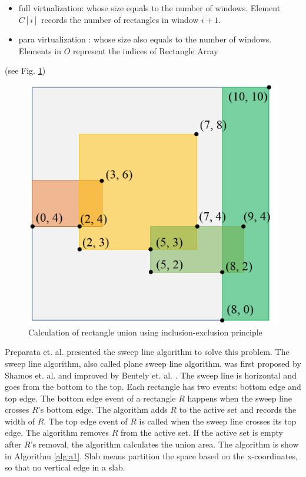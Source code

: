 \begin{itemize}
    \item full virtualization: whose size equals to the number of windows.  Element $C[i]$ records the number of rectangles in window $i+1$.
    \item para virtualization : whose size also equals to the number of windows.  Elements in $O$ represent the indices of Rectangle Array 
\end{itemize}

 (see Fig. \ref{fig:fig_2_2})
\begin{figure}[!h]
    \centering
    \includegraphics[scale=0.4]{image/fig_2_2}
    \caption{Calculation of rectangle union using inclusion-exclusion principle}
    \label{fig:fig_2_2}
\end{figure}

Preparata et. al. \cite{Preparata:1985:CGI:4333} presented the sweep line algorithm to solve this problem.  The sweep line algorithm, also called plane sweep line algorithm,  was first proposed by Shamos et. al. \cite{Shamos1976GeometricIP} and improved by Bentely et. al. \cite{Bentley1979AlgorithmsFR}.  The sweep line is horizontal and goes from the bottom to the top.   Each rectangle has two events: bottom edge and top edge.  The bottom edge event of a rectangle $R$ happens when the sweep line crosses $R$'s bottom edge.  The algorithm adds $R$ to the active set and records the width of $R$.  The top edge event of $R$ is called when the sweep line crosses its top edge.  The algorithm removes $R$ from the active set. If the active set is empty after $R$'s removal, the algorithm calculates the union area. The algorithm is show in Algorithm \ref{alg:a1}. Slab means partition the space based on the x-coordinates, so that no vertical edge in a slab. 

